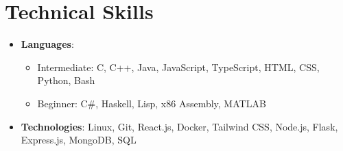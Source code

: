 \section{Technical Skills}
\begin{itemize}[leftmargin=0.15in, label={}, topsep=0.25ex, parsep=0.25ex]
    \small
    \item \textbf{Languages}: 
    \begin{itemize}[topsep=0.25ex, parsep=0.25ex]
        \item Intermediate: C, C++, Java, JavaScript, TypeScript, HTML, CSS, Python, Bash
        \item Beginner: C\#, Haskell, Lisp, x86 Assembly, MATLAB
    \end{itemize}
    \item \textbf{Technologies}: Linux, Git, React.js, Docker, Tailwind CSS, Node.js, Flask, Express.js, MongoDB, SQL
\end{itemize}


